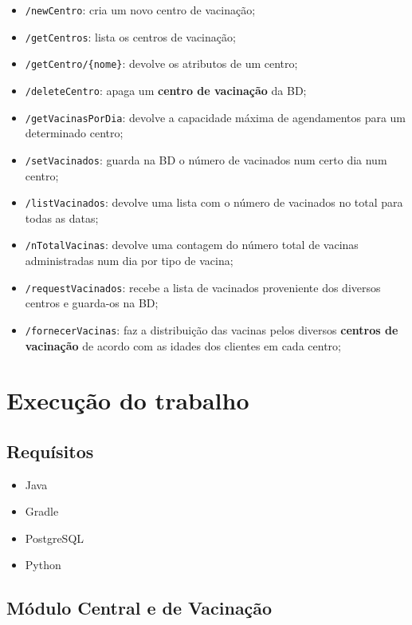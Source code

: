 \documentclass[11pt]{article}
\begin{document}
\begin{itemize}
    \item \verb|/newCentro|: cria um novo centro de vacinação;
    \item \verb|/getCentros|: lista os centros de vacinação;
    \item \verb|/getCentro/{nome}|: devolve os atributos de um centro;
    \item \verb|/deleteCentro|: apaga um \textbf{centro de vacinação} da BD;
    \item \verb|/getVacinasPorDia|: devolve a capacidade máxima de agendamentos para um determinado centro;
    \item \verb|/setVacinados|: guarda na BD o número de vacinados num certo dia num centro;
    \item \verb|/listVacinados|: devolve uma lista com o número de vacinados no total para todas as datas;
    \item \verb|/nTotalVacinas|: devolve uma contagem do número total de vacinas administradas num dia por tipo de vacina;
    \item \verb|/requestVacinados|: recebe a lista de vacinados proveniente dos diversos centros e guarda-os na BD;
    \item \verb|/fornecerVacinas|: faz a distribuição das vacinas pelos diversos \textbf{centros de vacinação} de acordo com as idades dos clientes em cada centro;

\end{itemize}

\section{Execução do trabalho}

\subsection{Requísitos}

\begin{itemize}
    \item Java
    \item Gradle
    \item PostgreSQL
    \item Python
\end{itemize}

\subsection{Módulo Central e de Vacinação}
\end{document}
